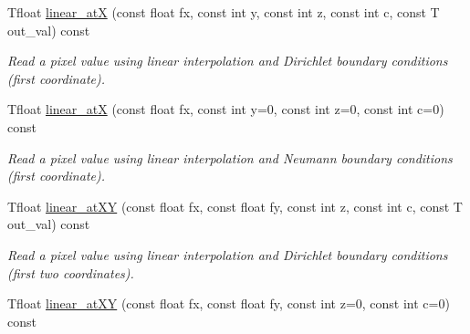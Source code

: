 \begin{DoxyCompactItemize}
\item 
\hypertarget{structcimg__library_1_1CImg_a8bb50717df61a39729e81ae66eaa4cf6}{
Tfloat \hyperlink{structcimg__library_1_1CImg_a8bb50717df61a39729e81ae66eaa4cf6}{linear\_\-atX} (const float fx, const int y, const int z, const int c, const T out\_\-val) const }
\label{structcimg__library_1_1CImg_a8bb50717df61a39729e81ae66eaa4cf6}

\begin{DoxyCompactList}\small\item\em Read a pixel value using linear interpolation and Dirichlet boundary conditions (first coordinate). \item\end{DoxyCompactList}\item 
\hypertarget{structcimg__library_1_1CImg_ae1342fd88947db88c613ab8ef075f8fe}{
Tfloat \hyperlink{structcimg__library_1_1CImg_ae1342fd88947db88c613ab8ef075f8fe}{linear\_\-atX} (const float fx, const int y=0, const int z=0, const int c=0) const }
\label{structcimg__library_1_1CImg_ae1342fd88947db88c613ab8ef075f8fe}

\begin{DoxyCompactList}\small\item\em Read a pixel value using linear interpolation and Neumann boundary conditions (first coordinate). \item\end{DoxyCompactList}\item 
\hypertarget{structcimg__library_1_1CImg_a324540cee77252bf38900ba5ceb3bd73}{
Tfloat \hyperlink{structcimg__library_1_1CImg_a324540cee77252bf38900ba5ceb3bd73}{linear\_\-atXY} (const float fx, const float fy, const int z, const int c, const T out\_\-val) const }
\label{structcimg__library_1_1CImg_a324540cee77252bf38900ba5ceb3bd73}

\begin{DoxyCompactList}\small\item\em Read a pixel value using linear interpolation and Dirichlet boundary conditions (first two coordinates). \item\end{DoxyCompactList}\item 
\hypertarget{structcimg__library_1_1CImg_aa208dee8f3f6d12828b53ad45a2840b9}{
Tfloat \hyperlink{structcimg__library_1_1CImg_aa208dee8f3f6d12828b53ad45a2840b9}{linear\_\-atXY} (const float fx, const float fy, const int z=0, const int c=0) const }
\label{structcimg__library_1_1CImg_aa208dee8f3f6d12828b53ad45a2840b9}


\end{DoxyCompactItemize}
